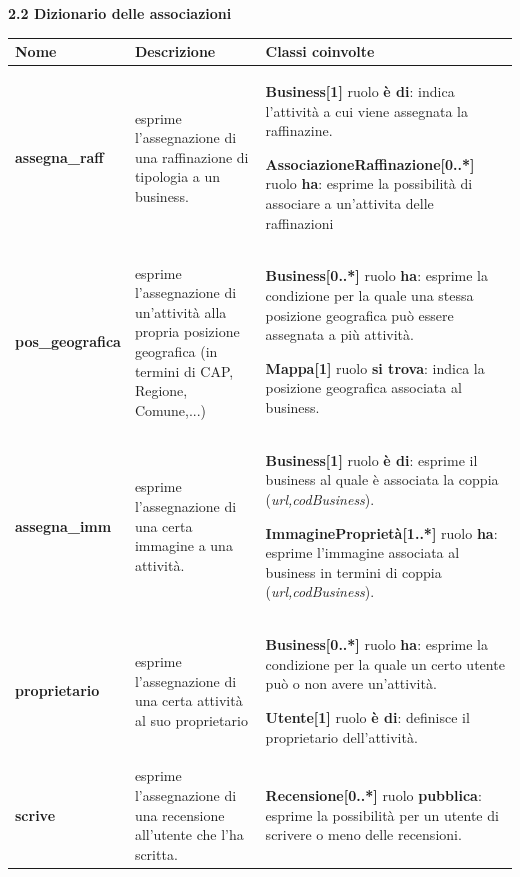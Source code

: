 \documentclass[a4paper,12pt]{article}
\begin{document}
\newpage\null{}\setcounter{page}{7}
\vspace{-2cm}
\begin{flushleft}
{\bf 2.2 Dizionario delle associazioni} 
\vspace{+1cm}
\begin{table}[htbp]
\begin{tabular}[c]{| m{3cm} | m{5cm} | m{7cm} |}
\hline
\bf Nome&\bf Descrizione&\bf Classi coinvolte\\
\hline
{\bf assegna\_raff}
&\small esprime l'assegnazione di una raffinazione di tipologia
a un business.
&\footnotesize
{\bf Business[1]} ruolo {\bf è di}: indica l'attività a cui viene 
assegnata la raffinazine.

{\bf AssociazioneRaffinazione[0..*]} ruolo {\bf ha}: esprime la possibilità di associare a un'attivita delle raffinazioni
\\
\hline

{\bf pos\_geografica}
&\small esprime l'assegnazione di un'attività alla propria posizione
geografica (in termini di CAP, Regione, Comune,...)
&\footnotesize
{\bf Business[0..*]} ruolo {\bf ha}: esprime la condizione per la quale
una stessa posizione geografica può essere assegnata a più attività.

{\bf Mappa[1]} ruolo {\bf si trova}: indica la posizione geografica
associata al business.
\\
\hline

{\bf assegna\_imm}
&\small esprime l'assegnazione di una certa immagine a una attività.
&\footnotesize
{\bf Business[1]} ruolo {\bf è di}: esprime il business al quale è
associata la coppia ({\it url,codBusiness}).

{\bf ImmagineProprietà[1..*]} ruolo {\bf ha}: esprime l'immagine associata
al business in termini di coppia ({\it url,codBusiness}).
\\
\hline

{\bf proprietario}
&\small esprime l'assegnazione di una certa attività al suo proprietario
&\footnotesize
{\bf Business[0..*]} ruolo {\bf ha}: esprime la condizione per la quale
un certo utente può o non avere un'attività.

{\bf Utente[1]} ruolo {\bf è di}: definisce il proprietario dell'attività.
\\
\hline

{\bf scrive}
&\small esprime l'assegnazione di una recensione all'utente che l'ha 
scritta.
&\footnotesize
{\bf Recensione[0..*]} ruolo {\bf pubblica}: esprime la possibilità per un
utente di scrivere o meno delle recensioni.


\end{tabular}
\end{table}
\end{flushleft}
\end{document}
